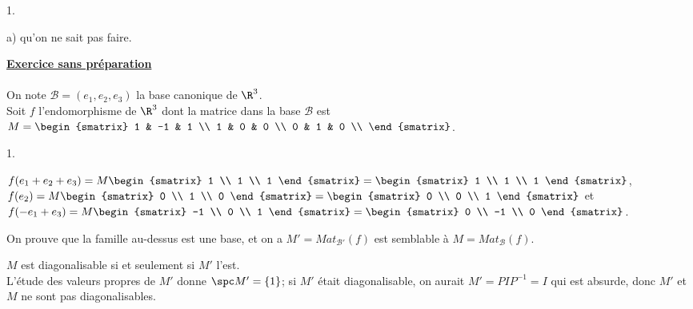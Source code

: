 \documentclass[11pt]{article}%
\begin{document}
\begin{exercice}
\begin{noliste}{1.}
\begin{noliste}{a)}
qu'on ne sait pas faire. \\
 \end{noliste}
 \end{noliste}
 \noindent \textbf{\underline{Exercice sans préparation}} \\
\\
 On note $\mathcal{B} = (e_{1}, e_{2}, e_{3})$ la base canonique de
$\R^{3}$. \\
 Soit $f$ l'endomorphisme de $\R^{3}$ dont la matrice dans la base
$\mathcal{B}$ est $M = \begin{smatrix}
1 & -1 & 1 \\
1 & 0 & 0 \\
0 & 1 & 0 \\
\end{smatrix}
$. \begin{noliste}{1.}
 \setlength{\itemsep}{4mm}
 \item $f(e_{1} + e_{2} + e_{3}) = M \begin{smatrix}
1 \\
1 \\
1
\end{smatrix}
 = \begin{smatrix}
1 \\
1 \\
1
\end{smatrix}
$, $f( e_{2} ) = M \begin{smatrix}
0 \\
1 \\
0
\end{smatrix}
 = \begin{smatrix}
0 \\
0 \\
1
\end{smatrix}
$ et $f(- e_{1} + e_{3}) = M \begin{smatrix}
-1 \\
0 \\
1
\end{smatrix}
 = \begin{smatrix}
0 \\
-1 \\
0
\end{smatrix}
$. \\
 \item On prouve que la famille au-dessus est une base, et on a $M' =
Mat_{\mathcal{B'}} (f)$ est semblable à $M = Mat_{\mathcal{B} } (f)$.
\\
 \item $M$ est diagonalisable si et seulement si $M'$ l'est. \\
 L'étude des valeurs propres de $M'$ donne $\spc M' = \{ 1 \}$; si $M'$
était diagonalisable, on aurait $M' = P I P^{-1} = I$ qui est absurde,
donc $M'$ et $M$ ne sont pas diagonalisables.
 \end{noliste}
 \end{exercice}
\end{document}
